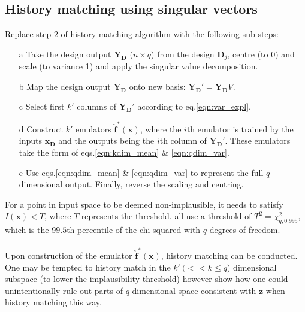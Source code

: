 \documentclass{article}
\newcommand{\numOutputs}{q}
\newcommand{\emulator}{\hat{f}}
\newcommand{\inputVec}{\mathbf{x}}
\newcommand{\outputVec}{\mathbf{y}}
\newcommand{\designInput}{\inputVec_\design}
\newcommand{\designOutput}{\outputVec_\design}
\newcommand{\design}{\mathbf{D}}
\newcommand{\obsqD}{\mathbf{z}}
\newcommand{\impl}{I}
\newcommand{\numDPs}{n}
\newcommand{\RSingVecs}{V}
\newcommand{\matRank}{k}
\newcommand{\thresh}{T}
\newcommand{\outputMat}{\mathbf{Y}_\design}%
\begin{document}
\subsection{History matching using singular vectors}
\label{hm-singVec}
Replace step 2 of history matching algorithm with the following sub-steps:
\begin{enumerate}
    \item[a] Take the design output $\outputMat$ ($\numDPs \times \numOutputs$) from the design $\design_j$, centre (to 0) and scale (to variance 1) and apply the singular value decomposition.

    \item[b] Map the design output $\outputMat$ onto new basis: $\outputMat' = \outputMat \RSingVecs$.

    \item[c] Select first $\matRank'$ columns of $\outputMat'$ according to eq.\eqref{eqn:var_expl}.
    
    \item[d] Construct $\matRank'$ emulators $\mathbf{\emulator^*}(\inputVec)$, where the $i$th emulator is trained by the inputs $\designInput$ and the outputs being the $i$th column of $\outputMat'$. These emulators take the form of eqs.\eqref{eqn:kdim_mean} \& \eqref{eqn:qdim_var}.
    
    \item[e] Use eqs.\eqref{eqn:qdim_mean} \& \eqref{eqn:qdim_var} to represent the full $\numOutputs$-dimensional output. Finally, reverse the scaling and centring.
\end{enumerate}
For a point in input space to be deemed non-implausible, it needs to satisfy $\impl(\inputVec) < \thresh$, where $\thresh$ represents the threshold. \citet{Vernon2010,Andrianakis2015,Salter2019} all use a threshold of $\thresh^2 = \chi_{\numOutputs,0.995}^2$, which is the $99.5$th percentile of the chi-squared with $\numOutputs$ degrees of freedom.\\\\
Upon construction of the emulator $\mathbf{\emulator}^*(\inputVec)$, history matching can be conducted. One may be tempted to history match in the $\matRank' \ (<< \matRank \leq \numOutputs$) dimensional subspace (to lower the implausibility threshold) however \citet{Salter2019} show how one could unintentionally rule out parts of $\numOutputs$-dimensional space consistent with $\obsqD$ when history matching this way.\\\\
\end{document}
